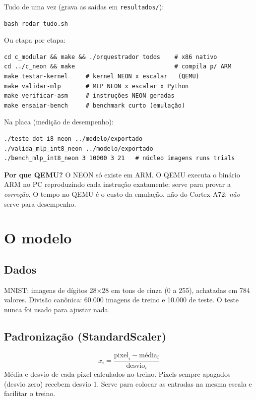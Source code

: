 \documentclass[10pt]{article}
\begin{document}
Tudo de uma vez (grava as saídas em \texttt{resultados/}):
\begin{lstlisting}
bash rodar_tudo.sh
\end{lstlisting}

Ou etapa por etapa:
\begin{lstlisting}
cd c_modular && make && ./orquestrador todos    # x86 nativo
cd ../c_neon && make                            # compila p/ ARM
make testar-kernel     # kernel NEON x escalar   (QEMU)
make validar-mlp       # MLP NEON x escalar x Python
make verificar-asm     # instruções NEON geradas
make ensaiar-bench     # benchmark curto (emulação)
\end{lstlisting}

Na placa (medição de desempenho):
\begin{lstlisting}
./teste_dot_i8_neon ../modelo/exportado
./valida_mlp_int8_neon ../modelo/exportado
./bench_mlp_int8_neon 3 10000 3 21   # núcleo imagens runs trials
\end{lstlisting}

\textbf{Por que QEMU?} O NEON só existe em ARM. O QEMU executa o binário ARM no PC reproduzindo cada
instrução exatamente: serve para provar a \emph{correção}. O tempo no QEMU é o custo da emulação, não
do Cortex-A72: \emph{não} serve para desempenho.

\section{O modelo}

\subsection{Dados}
MNIST: imagens de dígitos 28$\times$28 em tons de cinza (0 a 255), achatadas em 784 valores. Divisão
canônica: 60.000 imagens de treino e 10.000 de teste. O teste nunca foi usado para ajustar nada.

\subsection{Padronização (StandardScaler)}
\[
x_i = \frac{\text{pixel}_i - \text{média}_i}{\text{desvio}_i}
\]
Média e desvio de cada pixel calculados no treino. Pixels sempre apagados (desvio zero) recebem
desvio 1. Serve para colocar as entradas na mesma escala e facilitar o treino.
\end{document}
